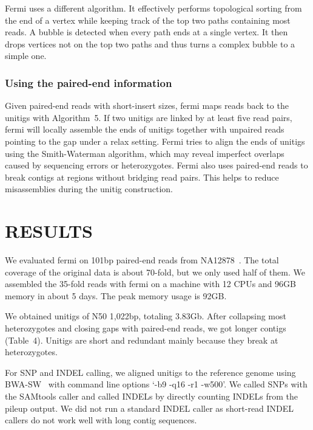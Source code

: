 \documentclass{bioinfo}
\begin{document}
\begin{methods}
Fermi uses a different algorithm. It effectively performs topological sorting
from the end of a vertex while keeping track of the top two paths containing
most reads. A bubble is detected when every path ends at a single vertex. It
then drops vertices not on the top two paths and thus turns a complex bubble to
a simple one.

\subsubsection{Using the paired-end information}
Given paired-end reads with short-insert sizes, fermi maps reads back to the
unitigs with Algorithm~5. If two unitigs are linked by at least five read
pairs, fermi will locally assemble the ends of unitigs together with unpaired
reads pointing to the gap under a relax setting. Fermi tries to align the
ends of unitigs using the Smith-Waterman algorithm, which may reveal imperfect
overlaps caused by sequencing errors or heterozygotes. Fermi also uses
paired-end reads to break contigs at regions without bridging read pairs. This
helps to reduce misassemblies during the unitig construction.
\end{methods}

\section{RESULTS}

We evaluated fermi on 101bp paired-end reads from NA12878~\citep{Depristo:2011vn}.
The total coverage of the original data is about 70-fold, but we only used half
of them. We assembled the 35-fold reads with fermi on a machine with 12 CPUs
and 96GB memory in about 5 days. The peak memory usage is 92GB.

We obtained unitigs of N50 1,022bp, totaling 3.83Gb. After collapsing
most heterozygotes and closing gaps with paired-end reads, we got longer contigs
(Table~4). Unitigs are short and redundant mainly because they break at
heterozygotes.

For SNP and INDEL calling, we aligned unitigs to the reference genome using
BWA-SW~\citep{Li:2010fk} with command line options `-b9 -q16 -r1 -w500'. We
called SNPs with the SAMtools caller and called INDELs by directly counting INDELs
from the pileup output. We did not run a standard INDEL caller as short-read
INDEL callers do not work well with long contig sequences.
\end{document}

